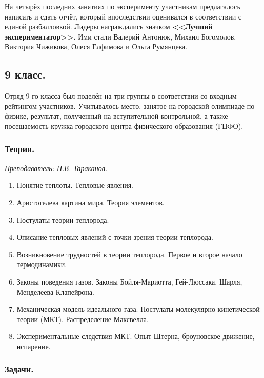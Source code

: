 \documentclass[12pt]{article}
\newlength{\h}
\newlength{\x}
\begin{document}
На четырёх последних занятиях по эксперименту участникам предлагалось
написать и сдать отчёт, который впоследствии оценивался в соответствии
с единой разбалловкой. Лидеры награждались значком \textbf{<<Лучший
  экспериментатор>>.} Ими стали Валерий Антонюк, Михаил Богомолов,
Виктория Чижикова, Олеся Елфимова и Ольга Румянцева. 

\subsection{9 класс.}
\label{sec:daily9}

Отряд 9-го класса был поделён на три группы в соответствии со входным
рейтингом участников. Учитывалось место, занятое на городской
олимпиаде по физике, результат, полученный на вступительной
контрольной, а также посещаемость кружка городского центра физического
образования (ГЦФО). 

\subsubsection{Теория.}
\label{sec:daily9th}

\textit{Преподаватель: Н.В. Тараканов.}\\

\begin{enumerate}
\item Понятие теплоты. Тепловые явления.
\item Аристотелева картина мира. Теория элементов.
\item Постулаты теории теплорода.
\item Описание тепловых явлений с точки зрения теории теплорода.
\item Возникновение трудностей в теории теплорода. Первое и второе
  начало термодинамики.
\item Законы поведения газов. Законы Бойля-Мариотта, Гей-Люссака,
  Шарля, Менделеева-Клапейрона.
\item Механическая модель идеального газа. Постулаты
  молекулярно-кинетической теории (МКТ). Распределение Максвелла.
\item Экспериментальные следствия МКТ. Опыт Штерна, броуновское
  движение, испарение.
\end{enumerate}

\subsubsection{Задачи.}
\label{sec:daily9pr}
\end{document}
